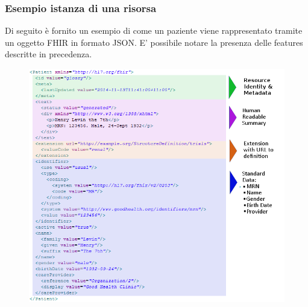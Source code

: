 \documentclass[a4paper]{article}
\begin{document}
\subsubsection*{Esempio istanza di una risorsa}
Di seguito è fornito un esempio di come un paziente viene rappresentato tramite un oggetto FHIR in formato JSON.
E' possibile notare la presenza delle features descritte in precedenza.
\begin{figure}[H]
    \centering
    \includegraphics[width=1 \textwidth]{figures/esempio paziente.png}
    \label{fig:esempioPaziente}
\end{figure}
\end{document}
